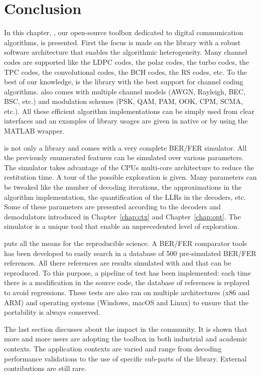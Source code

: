 \section{Conclusion}

In this chapter, \AFFECT, our open-source toolbox dedicated to digital
communication algorithms, is presented. First the focus is made on the library
with a robust software architecture that enables the algorithmic heterogeneity.
Many channel codes are supported like the LDPC codes, the polar codes, the turbo
codes, the TPC codes, the convolutional codes, the BCH codes, the RS codes, etc.
To the best of our knowledge, \AFFECT is the library with the best support for
channel coding algorithms. \AFFECT also comes with multiple channel models
(AWGN, Rayleigh, BEC, BSC, etc.) and modulation schemes (PSK, QAM, PAM, OOK,
CPM, SCMA, etc.). All these efficient algorithm implementations can be simply
used from clear interfaces and an examples of library usages are given in native
\Cxx or by using the MATLAB wrapper.

\AFFECT is not only a library and comes with a very complete BER/FER simulator.
All the previously enumerated features can be simulated over various parameters.
The simulator takes advantage of the CPUs multi-core architecture to reduce the
restitution time. A tour of the possible exploration is given. Many parameters
can be tweaked like the number of decoding iterations, the approximations in the
algorithm implementation, the quantification of the LLRs in the decoders, etc.
Some of these parameters are presented according to the decoders and
demodulators introduced in Chapter~\ref{chap:ctx} and Chapter~\ref{chap:opt}.
The \AFFECT simulator is a unique tool that enable an unprecedented level of
exploration.

\AFFECT puts all the means for the reproducible science. A BER/FER comparator
tools has been developed to easily search in a database of 500 pre-simulated
BER/FER references. All there references are results simulated with \AFFECT and
that can be reproduced. To this purpose, a pipeline of test has been
implemented: each time there is a modification in the source code, the database
of references is replayed to avoid regressions. These tests are also ran on
multiple architectures (x86 and ARM\R) and operating systems (Windows, macOS and
Linux) to ensure that the portability is always conserved.

The last section discusses about the \AFFECT impact in the community. It is
shown that more and more users are adopting the toolbox in both industrial
and academic contexts. The application contexts are varied and range from
decoding performance validations to the use of specific sub-parts of the
library. External contributions are still rare.
